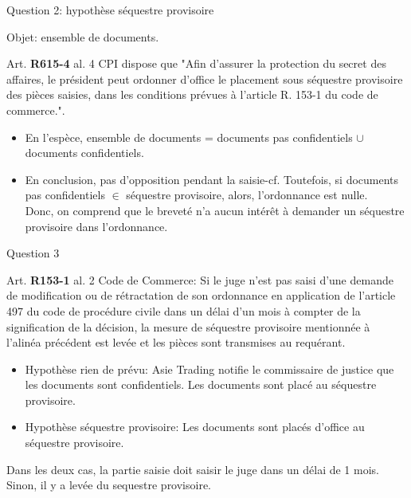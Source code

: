 \begin{frame}{Question 2: hypothèse séquestre provisoire}


Objet: ensemble de documents.

\begin{block}{}
Art. \textbf{R615-4} al. 4 CPI dispose que "Afin d'assurer la protection du secret des affaires, 
le président peut ordonner d'office le placement sous séquestre provisoire des pièces saisies, 
dans les conditions prévues à l'article R. 153-1 du code de commerce.".
\end{block}

\begin{itemize}
    \item En l'espèce,
    ensemble de documents = documents pas confidentiels $\cup$ documents confidentiels.
    \item En conclusion, pas d'opposition pendant la saisie-cf.
    Toutefois, si documents pas confidentiels $\in$ séquestre provisoire,
    alors, l'ordonnance est nulle.\\    
    Donc, on comprend que le breveté n'a aucun intérêt à demander
    un séquestre provisoire dans l'ordonnance.
\end{itemize}

\end{frame}

\begin{frame}{Question 3}

\begin{block}{}
Art. \textbf{R153-1} al. 2 Code de Commerce: Si le juge n'est pas saisi d'une demande
 de modification ou de rétractation 
de son ordonnance en application de l'article 497 du code de procédure civile 
dans un délai d'un mois à compter de la signification de la décision, 
la mesure de séquestre provisoire mentionnée à l'alinéa précédent est levée 
et les pièces sont transmises au requérant.
\end{block}

\begin{itemize}
    \item Hypothèse rien de prévu: Asie Trading notifie le commissaire
    de justice que les documents sont confidentiels. Les documents
    sont placé au séquestre provisoire.
    \item Hypothèse séquestre provisoire: Les documents
    sont placés d'office au séquestre provisoire.
\end{itemize}
Dans les deux cas, la partie saisie doit saisir le juge dans un délai de 1 mois.
    Sinon, il y a levée du sequestre provisoire.
\end{frame}


